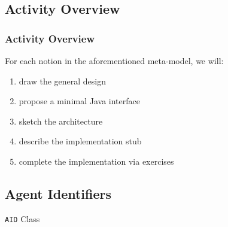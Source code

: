 \documentclass[presentation]{beamer}\mode<presentation>{\usetheme{AMSCesenaPurpleAndGold}}
\begin{document}
\subsection{Activity Overview}

\begin{frame}%
	\frametitle{Activity Overview}
	
	For each notion in the aforementioned meta-model, we will:
	\vfill
	\begin{enumerate}
		\item draw the general design
		
		\vfill
		
		\item propose a minimal Java interface
		
		\vfill
		
		\item sketch the architecture
		
		\vfill
		
		\item describe the implementation stub
		
		\vfill
		
		\item complete the implementation via exercises
	\end{enumerate}
	
\end{frame}

\subsection{Agent Identifiers}

\begin{frame}{\texttt{AID} Class}
	
	
	
\end{frame}
\end{document}
